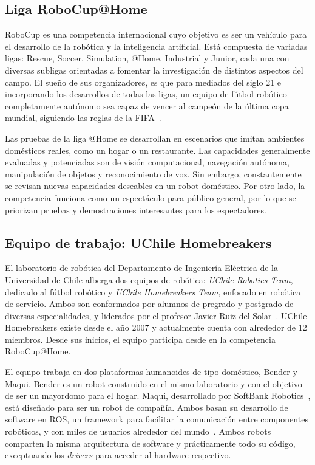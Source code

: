 \subsection{Liga RoboCup@Home}

RoboCup es una competencia internacional cuyo objetivo es ser un vehículo para el desarrollo de la robótica y la inteligencia artificial. Está compuesta de variadas ligas: Rescue, Soccer, Simulation, @Home, Industrial y Junior, cada una con diversas subligas orientadas a fomentar la investigación de distintos aspectos del campo. El sueño de sus organizadores, es que para mediados del siglo 21 e incorporando los desarrollos de todas las ligas, un equipo de fútbol robótico completamente autónomo sea capaz de vencer al campeón de la última copa mundial, siguiendo las reglas de la FIFA~\cite{robocup:rulebook_2018}.

Las pruebas de la liga @Home se desarrollan en escenarios que imitan ambientes domésticos reales, como un hogar o un restaurante. Las capacidades generalmente evaluadas y potenciadas son de visión computacional, navegación autónoma, manipulación de objetos y reconocimiento de voz. Sin embargo, constantemente se revisan nuevas capacidades deseables en un robot doméstico. Por otro lado, la competencia funciona como un espectáculo para público general, por lo que se priorizan pruebas y demostraciones interesantes para los espectadores.

\subsection{Equipo de trabajo: UChile Homebreakers}

El laboratorio de robótica del Departamento de Ingeniería Eléctrica de la Universidad de Chile alberga dos equipos de robótica: \textit{UChile Robotics Team}, dedicado al fútbol robótico y \textit{UChile Homebreakers Team}, enfocado en robótica de servicio. Ambos son conformados por alumnos de pregrado y postgrado de diversas especialidades, y liderados por el profesor Javier Ruiz del Solar~\cite{uchile-robotics}. UChile Homebreakers existe desde el año 2007 y actualmente cuenta con alrededor de 12 miembros. Desde sus inicios, el equipo participa desde en la competencia RoboCup@Home.

El equipo trabaja en dos plataformas humanoides de tipo doméstico, Bender y Maqui. Bender es un robot construido en el mismo laboratorio y con el objetivo de ser un mayordomo para el hogar. Maqui, desarrollado por SoftBank Robotics~\cite{softbank}, está diseñado para ser un robot de compañía. Ambos basan su desarrollo de software en ROS, un framework para facilitar la comunicación entre componentes robóticos, y con miles de usuarios alrededor del mundo~\cite{ROS:2009}. Ambos robots comparten la misma arquitectura de software y prácticamente todo su código, exceptuando los \textit{drivers} para acceder al hardware respectivo. 


